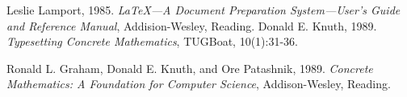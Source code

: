 \documentclass[journal]{IEEEtran}
\begin{document}
\begin{thebibliography}{9}
 Leslie Lamport, 1985. \emph{\LaTeX---A Document
Preparation System---User’s Guide and Reference Manual},
Addision-Wesley, Reading.
 Donald E. Knuth, 1989. \emph{Typesetting Concrete
Mathematics}, TUGBoat, 10(1):31-36.

 Ronald L. Graham, Donald E. Knuth, and Ore
Patashnik, 1989. \emph{Concrete Mathematics: A Foundation for
Computer Science}, Addison-Wesley, Reading.
\end{thebibliography}
% 







\end{document}
